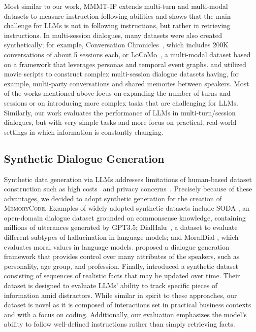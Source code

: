 Most similar to our work, MMMT-IF \citep{epstein2024mmmt} extends multi-turn and multi-modal datasets to measure instruction-following abilities and shows that the main challenge for LLMs is not in following instructions, but rather in retrieving instructions.
In multi-session dialogues, many datasets were also created synthetically; for example, Conversation Chronicles~\citep{jang2023conversation}, which includes 200K conversations of about 5 sessions each, or LoCoMo~\citep{maharana-etal-2024-evaluating}, a multi-modal dataset based on a framework that leverages personas and temporal event graphs.
\citet{kim2024share} and \citet{kim2024dialsim} utilized movie scripts to construct complex multi-session dialogue datasets having, for example, multi-party conversations and shared memories between speakers. 
Most of the works mentioned above focus on expanding the number of turns and sessions or on introducing more complex tasks that are challenging for LLMs. Similarly, our work evaluates the performance of LLMs in multi-turn/session dialogues, but with very simple tasks and more focus on practical, real-world settings in which information is constantly changing.


\subsection{Synthetic Dialogue Generation}
Synthetic data generation via LLMs addresses limitations of human-based dataset construction such as high costs~\citep{doi:10.1073/pnas.2305016120} and privacy concerns~\citep{kurakin2023harnessing}. Precisely because of these advantages, we decided to adopt synthetic generation for the creation of \textsc{MemoryCode}. Examples of widely adopted synthetic datasets include SODA \cite{kim-etal-2023-soda}, an open-domain dialogue dataset grounded on commonsense knowledge, containing millions of utterances generated by GPT3.5;
DialHalu~\citep{chen2024diahalu}, a dataset to evaluate different subtypes of hallucination in language models; and 
MoralDial \citep{sun-etal-2023-moraldial}, which evaluates moral values in language models. 
\citet{wu2024hiding} proposed a dialogue generation framework that provides control over many attributes of the speakers, such as personality, age group, and profession. Finally, \citet{rakotonirina-baroni-2024-memoryprompt} introduced a synthetic dataset consisting of sequences of realistic facts that may be updated over time. Their dataset is designed to evaluate LLMs' ability to track specific pieces of information amid distractors. 
While similar in spirit to these approaches, our dataset is novel as it is composed of interactions set in practical business contexts and with a focus on coding.
Additionally, our evaluation emphasizes the model's ability to follow well-defined instructions rather than simply retrieving facts.






